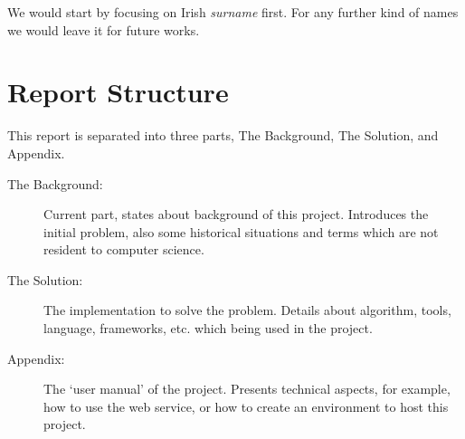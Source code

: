 We would start by focusing on Irish \textit{surname} first.
For any further kind of names we would leave it for future works.

\section{Report Structure}

This report is separated into three parts, The Background, The Solution,
and Appendix.

\begin{description}
\item[The Background:]
  Current part, states about background of this project. Introduces
  the initial problem, also some historical situations and terms
  which are not resident to computer science.
\item[The Solution:]
  The implementation to solve the problem. Details about algorithm,
  tools, language, frameworks, etc. which being used in the project.
\item[Appendix:]
  The `user manual' of the project. Presents technical aspects,
  for example, how to use the web service, or how to create an environment
  to host this project.
\end{description}
